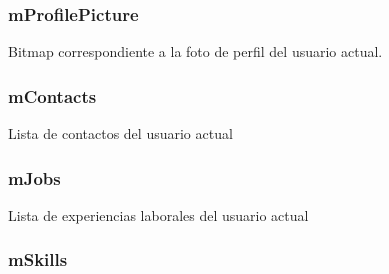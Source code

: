 \documentclass[letterpaper,10pt,english]{sphinxmanual}
\begin{document}
\subsubsection{mProfilePicture}
\label{Singletons/InformationHolder:mprofilepicture}

\begin{fulllineitems}
\label{Singletons/InformationHolder:com.fiuba.tallerii.jobify.InformationHolder.mProfilePicture}
Bitmap correspondiente a la foto de perfil del usuario actual.

\end{fulllineitems}



\subsubsection{mContacts}
\label{Singletons/InformationHolder:mcontacts}

\begin{fulllineitems}
\label{Singletons/InformationHolder:com.fiuba.tallerii.jobify.InformationHolder.mContacts}
Lista de contactos del usuario actual

\end{fulllineitems}



\subsubsection{mJobs}
\label{Singletons/InformationHolder:mjobs}

\begin{fulllineitems}
\label{Singletons/InformationHolder:com.fiuba.tallerii.jobify.InformationHolder.mJobs}
Lista de experiencias laborales del usuario actual

\end{fulllineitems}



\subsubsection{mSkills}
\label{Singletons/InformationHolder:mskills}
\end{document}
